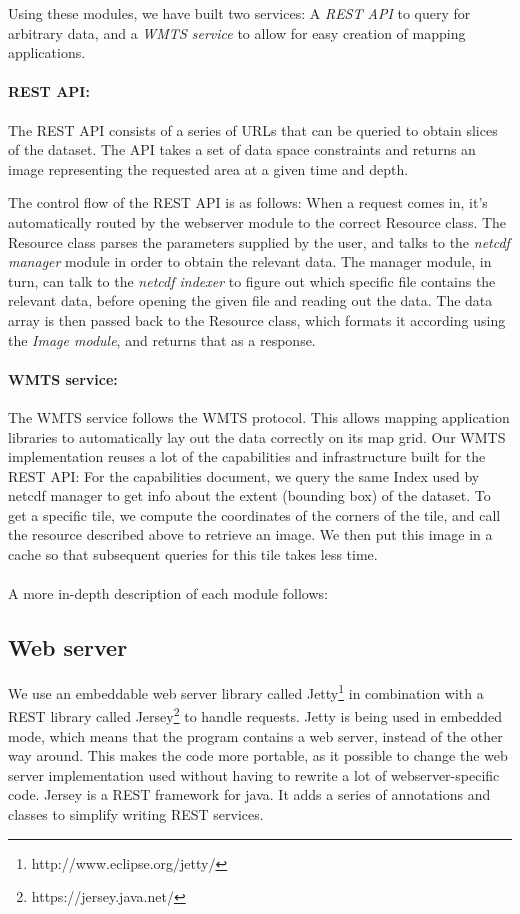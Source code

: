 \documentclass[11pt,a4paper,titlepage,oneside]{report}
\begin{document}
Using these modules, we have built two services: A \textit{REST \gls{API}} to query for arbitrary data, and a \textit{\gls{WMTS} service} to allow for easy creation of mapping applications.


\paragraph{REST API:}
The REST \gls{API} consists of a series of \gls{URL}s that can be queried to obtain slices of the dataset. The \gls{API} takes a set of data space constraints and returns an image representing the requested area at a given time and depth.

The control flow of the REST \gls{API} is as follows:  
When a request comes in, it's automatically routed by the webserver module to the correct Resource class. The Resource class parses the parameters supplied by the user, and talks to the \textit{\gls{netcdf} manager} module in order to obtain the relevant data.
The manager module, in turn, can talk to the \textit{\gls{netcdf} indexer} to figure out which specific file contains the relevant data, before opening the given file and reading out the data. 
The data array is then passed back to the Resource class, which formats it according using the \textit{Image module}, and returns that as a response.

\paragraph{WMTS service:}
The \gls{WMTS} service follows the \gls{WMTS} \gls{protocol}\cite{WMTS:spec}.
This allows mapping application libraries to automatically lay out the data correctly on its map grid.  
Our \gls{WMTS} implementation reuses a lot of the capabilities and infrastructure built for the REST \gls{API}:  
For the capabilities document, we query the same Index used by \gls{netcdf} manager to get info about the extent (bounding box) of the dataset.
To get a specific tile, we compute the coordinates of the corners of the tile, and call the resource described above to retrieve an image.
We then put this image in a cache so that subsequent queries for this tile takes less time.

\paragraph{}
A more in-depth description of each module follows:

\subsection{Web server}
We use an embeddable web server library called Jetty\footnote{http://www.eclipse.org/jetty/} in combination with a REST library called Jersey\footnote{https://jersey.java.net/} to handle requests.
Jetty is being used in embedded mode, which means that the program contains a web server, instead of the other way around. This makes the code more portable, as it possible to change the web server implementation used without having to rewrite a lot of webserver-specific code.
Jersey is a REST framework for java. It adds a series of annotations and classes to simplify writing REST services.
\end{document}
